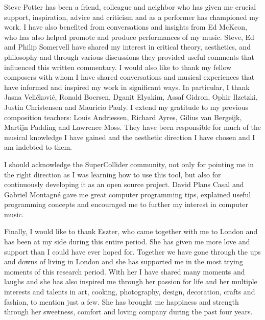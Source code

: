 Steve Potter has been a friend, colleague and neighbor who has given me crucial support, inspiration, advice and criticism and as a performer has championed my work. I have also benefited from conversations and insights from Ed McKeon, who has also helped promote and produce performances of my music. Steve, Ed and Philip Somervell have shared my interest in critical theory, aesthetics, and philosophy and through various discussions they provided useful comments that influenced this written commentary. I would also like to thank my fellow composers with whom I have shared conversations and musical experiences that have informed and inspired my work in significant ways. In particular, I thank Jasna Veli\v{c}kovi\'{c}, Ronald Boersen, Dganit Elyakim, Assaf Gidron, Ophir Ilzetzki, Justin Christensen and Mauricio Pauly. I extend my gratitude to my previous composition teachers: Louis Andriessen, Richard Ayres, Gilius van Bergeijk, Martijn Padding and Lawrence Moss. They have been responsible for much of the musical knowledge I have gained and the aesthetic direction I have chosen and I am indebted to them.

I should acknowledge the SuperCollider community, not only for pointing me in the right direction as I was learning how to use this tool, but also for continuously developing it as an open source project. David Plans Casal and Gabriel Montagn\'e gave me great computer programming tips, explained useful programming concepts and encouraged me to further my interest in computer music.

Finally, I would like to thank Eszter, who came together with me to London and has been at my side during this entire period. She has given me more love and support than I could have ever hoped for. Together we have gone through the ups and downs of living in London and she has supported me in the most trying moments of this research period. With her I have shared many moments and laughs and she has also inspired me through her passion for life and her multiple interests and talents in art, cooking, photography, design, decoration, crafts and fashion, to mention just a few. She has brought me happiness and strength through her sweetness, comfort and loving company during the past four years.  
